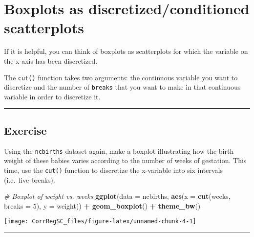 \documentclass[
]{book}
\newenvironment{Shaded}{\begin{snugshade}}{\end{snugshade}}
\newcommand{\CommentTok}[1]{\textcolor[rgb]{0.56,0.35,0.01}{\textit{#1}}}
\newcommand{\DataTypeTok}[1]{\textcolor[rgb]{0.13,0.29,0.53}{#1}}
\newcommand{\DecValTok}[1]{\textcolor[rgb]{0.00,0.00,0.81}{#1}}
\newcommand{\KeywordTok}[1]{\textcolor[rgb]{0.13,0.29,0.53}{\textbf{#1}}}
\newcommand{\NormalTok}[1]{#1}
\newcommand{\OperatorTok}[1]{\textcolor[rgb]{0.81,0.36,0.00}{\textbf{#1}}}
\newcommand{\StringTok}[1]{\textcolor[rgb]{0.31,0.60,0.02}{#1}}
\begin{document}
\hypertarget{boxplots-as-discretizedconditioned-scatterplots}{%
\section{Boxplots as discretized/conditioned scatterplots}\label{boxplots-as-discretizedconditioned-scatterplots}}

If it is helpful, you can think of boxplots as scatterplots for which the variable on the x-axis has been discretized.

The \texttt{cut()} function takes two arguments: the continuous variable you want to discretize and the number of \texttt{breaks} that you want to make in that continuous variable in order to discretize it.

\begin{center}\rule{0.5\linewidth}{0.5pt}\end{center}

\hypertarget{exercise-1}{%
\subsection*{Exercise}\label{exercise-1}}

Using the \texttt{ncbirths} dataset again, make a boxplot illustrating how the birth weight of these babies varies according to the number of weeks of gestation. This time, use the \texttt{cut()} function to discretize the x-variable into six intervals (i.e.~five breaks).

\begin{Shaded}
\begin{Highlighting}[]
\CommentTok{# Boxplot of weight vs. weeks}
\KeywordTok{ggplot}\NormalTok{(}\DataTypeTok{data =}\NormalTok{ ncbirths, }
       \KeywordTok{aes}\NormalTok{(}\DataTypeTok{x =} \KeywordTok{cut}\NormalTok{(weeks, }\DataTypeTok{breaks =} \DecValTok{5}\NormalTok{), }\DataTypeTok{y =}\NormalTok{ weight)) }\OperatorTok{+}\StringTok{ }
\StringTok{       }\KeywordTok{geom_boxplot}\NormalTok{() }\OperatorTok{+}\StringTok{ }
\StringTok{       }\KeywordTok{theme_bw}\NormalTok{()}
\end{Highlighting}
\end{Shaded}

\begin{center}\texttt{[image: CorrRegSC\_files/figure-latex/unnamed-chunk-4-1]} \end{center}

\begin{center}\rule{0.5\linewidth}{0.5pt}\end{center}
\end{document}
